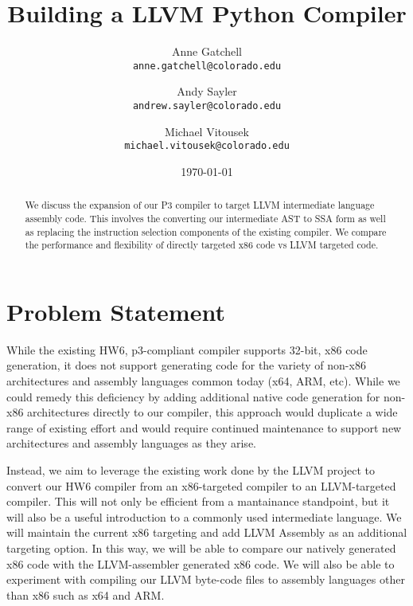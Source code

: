 \documentclass[11pt]{article}
\begin{document}
\title{
  Building a LLVM Python Compiler
}

\author{
  Anne Gatchell    \\ \texttt{anne.gatchell@colorado.edu} \and
  Andy Sayler      \\ \texttt{andrew.sayler@colorado.edu} \and
  Michael Vitousek \\ \texttt{michael.vitousek@colorado.edu}
}

\date{\today}

\maketitle

\begin{abstract}

We discuss the expansion of our P3 compiler to target LLVM intermediate
language assembly code. This involves the converting our intermediate
AST to SSA form as well as replacing the instruction selection
components of the existing compiler. We compare the performance and
flexibility of directly targeted x86 code vs LLVM targeted code.

\end{abstract}

\section{Problem Statement}

While the existing HW6, p3-compliant compiler supports 32-bit, x86
code generation, it does not support generating code for the variety
of non-x86 architectures and assembly languages common today (x64,
ARM, etc). While we could remedy this deficiency by adding additional
native code generation for non-x86 architectures directly to our
compiler, this approach would duplicate a wide range of existing
effort and would require continued maintenance to support new
architectures and assembly languages as they arise.

Instead, we aim to leverage the existing work done by the LLVM project
\cite{llvm.org} to convert our HW6 compiler from an x86-targeted
compiler to an LLVM-targeted compiler. This will not only be efficient
from a mantainance standpoint, but it will also be a useful
introduction to a commonly used intermediate language. We will
maintain the current x86 targeting and add LLVM
Assembly\cite{lattner-llvmlangref} as an additional targeting
option. In this way, we will be able to compare our natively generated
x86 code with the LLVM-assembler generated x86 code. We will also be
able to experiment with compiling our LLVM byte-code files to assembly
languages other than x86 such as x64 and ARM.
\end{document}
